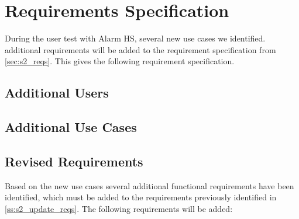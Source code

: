 \section{Requirements Specification} \label{sec:s3_requirements}
During the user test with Alarm HS, several new use cases we identified.  additional requirements will be added to the requirement specification from \cref{sec:s2_reqs}. This gives the following requirement specification.

\subsection{Additional Users} \label{ss:s3_users}

\subsection{Additional Use Cases \label{ss:s3_uc}}

\subsection{Revised Requirements} \label{ss:s2_reqs}
Based on the new use cases several additional functional requirements have been identified, which must be added to the requirements previously identified in \cref{ss:s2_update_reqs}. The following requirements will be added:

